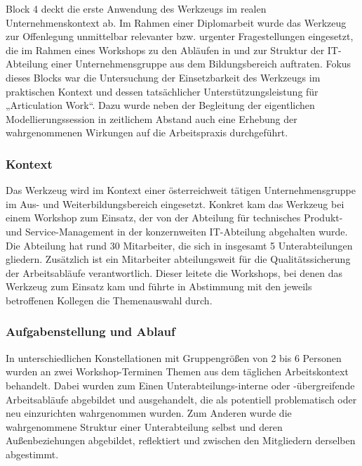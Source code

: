 Block 4 deckt die erste Anwendung des Werkzeugs im realen Unternehmenskontext ab. Im Rahmen einer Diplomarbeit \citep{Wahlmuller10} wurde das Werkzeug zur Offenlegung unmittelbar relevanter bzw. urgenter Fragestellungen eingesetzt, die im Rahmen eines Workshops zu den Abläufen in und zur Struktur der IT-Abteilung einer Unternehmensgruppe aus dem Bildungsbereich auftraten. Fokus dieses Blocks war die Untersuchung der Einsetzbarkeit des Werkzeugs im praktischen Kontext und dessen tatsächlicher Unterstützungsleistung für „Articulation Work“. Dazu wurde neben der Begleitung der eigentlichen Modellierungssession in zeitlichem Abstand auch eine Erhebung der wahrgenommenen Wirkungen auf die Arbeitspraxis durchgeführt.

\subsubsection{Kontext} %
\label{ssub:4_kontext}

Das Werkzeug wird im Kontext einer österreichweit tätigen Unternehmensgruppe im Aus- und Weiterbildungsbereich eingesetzt. Konkret kam das Werkzeug bei einem Workshop zum Einsatz, der von der Abteilung für technisches Produkt- und Service-Management in der konzernweiten IT-Abteilung abgehalten wurde. Die Abteilung hat rund 30 Mitarbeiter, die sich in insgesamt 5 Unterabteilungen gliedern. Zusätzlich ist ein Mitarbeiter abteilungsweit für die Qualitätssicherung der Arbeitsabläufe verantwortlich. Dieser leitete die Workshops, bei denen das Werkzeug zum Einsatz kam und führte in Abstimmung mit den jeweils betroffenen Kollegen die Themenauswahl durch.


\subsubsection{Aufgabenstellung und Ablauf} %
\label{ssub:4_aufgabenstellung}

In unterschiedlichen Konstellationen mit Gruppengrößen von 2 bis 6 Personen wurden an zwei Workshop-Terminen Themen aus dem täglichen Arbeitskontext behandelt. Dabei wurden zum Einen Unterabteilungs-interne oder -übergreifende Arbeitsabläufe abgebildet und ausgehandelt, die als potentiell problematisch oder neu einzurichten wahrgenommen wurden. Zum Anderen wurde die wahrgenommene Struktur einer Unterabteilung selbst und deren Außenbeziehungen abgebildet, reflektiert und zwischen den Mitgliedern derselben abgestimmt.

